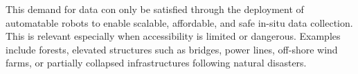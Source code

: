 
This demand for data con only be satisfied through the deployment of automatable robots to enable scalable, affordable, and safe in-situ data collection. This is relevant especially when accessibility is limited or dangerous. Examples include forests, elevated structures such as bridges, power lines, off-shore wind farms, or partially collapsed infrastructures following natural disasters. 



